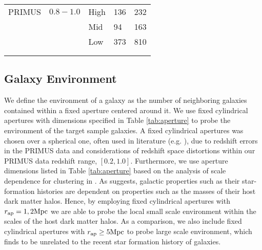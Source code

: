 \documentclass{emulateapj}
\begin{document}
\begin{table*}
\begin{center}
\begin{tabular}{lllll}
            &               &               &                       &                           \\ \hline
  PRIMUS    &$0.8-1.0$      &High           &136                       &232                           \\
            &               &Mid            &94                       &163                           \\
            &               &Low            &373                       &810                           \\
            &               &               &                       &                           \\ \hline
  \multicolumn{5}{l}{}                                             \\       
    \end{tabular}
  \end{center}
\end{table*}

\subsection{Galaxy Environment} \label{sec:environment}
We define the environment of a galaxy as the number of neighboring galaxies contained within a fixed aperture centered around it.
We use fixed cylindrical apertures with dimensions specified in Table \ref{tab:aperture} to probe the environment of the target sample galaxies. 
A fixed cylindrical apertures was chosen over a spherical one, often used in literature (e.g. \cite{Croton:2005aa}), due to redshift errors in the PRIMUS data 
and considerations of redshift space distortions within our PRIMUS data redshift range, $[0.2,1.0]$.
Furthermore, we use aperture dimensions listed in Table \ref{tab:aperture} based on the analysis of scale dependence for clustering in \cite{Blanton:2006aa}.
As \cite{Blanton:2006aa} suggests, galactic properties such as their star-formation histories are dependent on properties such as the masses of their host dark matter halos.
Hence, by employing fixed cylindrical apertures with $r_{\rm{ap}} = 1, 2 \rm{Mpc}$ we are able to probe the local small scale environment within the scales of the host dark matter halos.
As a comparison, we also include fixed cylindrical apertures with $r_{\rm{ap}} \ge 5 \rm{Mpc}$ to probe large scale environment, which \cite{Blanton:2006aa} finds to be unrelated to the 
recent star formation history of galaxies.
\end{document}
